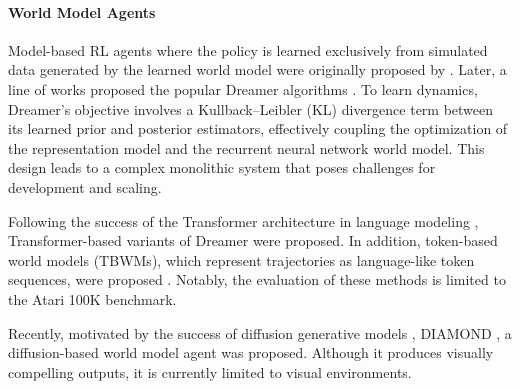 \paragraph{World Model Agents}
Model-based RL agents where the policy is learned exclusively from simulated data generated by the learned world model were originally proposed by \cite{ha2018worldmodels}.
Later, a line of works proposed the popular Dreamer algorithms \cite{Hafner2020Dreamerv1, hafner2021dreamerv2, hafner2023mastering}.
To learn dynamics, Dreamer's objective involves a Kullback–Leibler (KL) divergence term between its learned prior and posterior estimators, effectively coupling the optimization of the representation model and the recurrent neural network world model.
This design leads to a complex monolithic system that poses challenges for development and scaling.

Following the success of the Transformer architecture \cite{NIPS2017_attn_is_all_you_need} in language modeling \cite{brown2020LMsFewShotLearners}, Transformer-based variants of Dreamer \cite{zhang2024storm, robine2023transformer} were proposed.
In addition, token-based world models (TBWMs), which represent trajectories as language-like token sequences, were proposed \cite{micheli2022transformers, cohen2024improving}.
Notably, the evaluation of these methods is limited to the Atari 100K benchmark.

Recently, motivated by the success of diffusion generative models \cite{Rombach_2022_latentDiffusion}, DIAMOND \cite{alonso2024diffusion}, a diffusion-based world model agent was proposed.
Although it produces visually compelling outputs, it is currently limited to visual environments.










